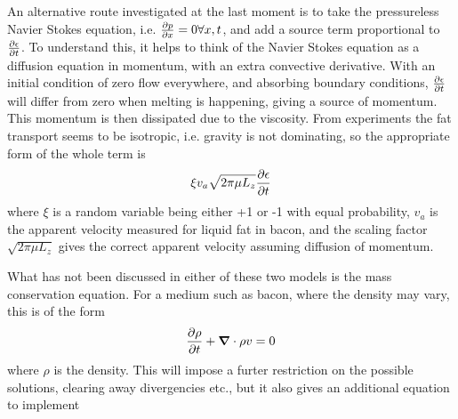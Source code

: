 An alternative route investigated at the last moment is to take the pressureless
Navier Stokes equation, i.e. $\frac{\partial p}{\partial x} = 0 \forall x,t$, and add a source term
proportional to $\frac{\partial \epsilon}{\partial t}$. To understand this, it helps to think of the
Navier Stokes equation as a diffusion equation in momentum, with an extra
convective derivative. With an initial condition of zero flow everywhere, and
absorbing boundary conditions, $\frac{\partial \epsilon}{\partial t}$ will differ from zero when
melting is happening, giving a source of momentum. This momentum is then dissipated due to
the viscosity. From experiments the fat transport seems to be isotropic, i.e.
gravity is not dominating, so the appropriate form of the whole term is
\begin{equation}
  \xi v_a \sqrt{2\pi \mu L_z} \frac{\partial \epsilon}{\partial t}
  \label{eq:diffusion}
\end{equation}
where $\xi$ is a random variable being either +1 or -1 with equal probability,
$v_a$ is the apparent velocity measured for liquid fat in bacon, and the scaling
factor $\sqrt{2\pi\mu L_z}$ gives the correct apparent velocity assuming
diffusion of momentum.

What has not been discussed in either of these two models is the mass
conservation equation. For a medium such as bacon, where the density may vary,
this is of the form
\begin{equation}
  \frac{\partial \rho}{\partial t} + \mbox{\boldmath$ \nabla $} \cdot \rho v = 0
  \label{massconservation}
\end{equation}
where $\rho$ is the density. This will impose a furter restriction on the
possible solutions, clearing away divergencies etc., but it also gives an
additional equation to implement
